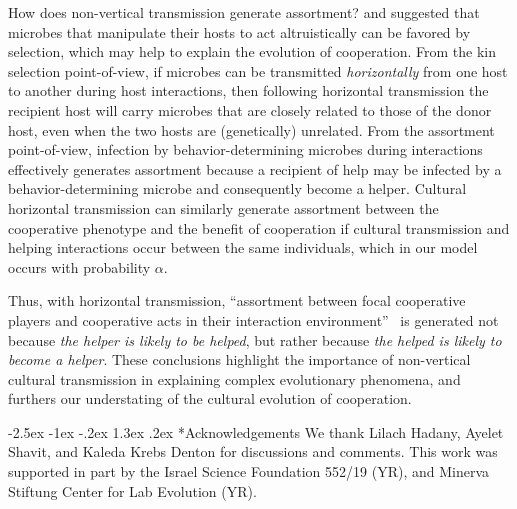 \documentclass[12pt]{extarticle}
\makeatletter
\renewcommand\section{\@startsection {section}{1}{\z@}%
     {-2.5ex \@plus -1ex \@minus -.2ex}%
     {1.3ex \@plus.2ex}%
    {\Large\bfseries}}
\makeatother
\begin{document}
{How does non-vertical transmission generate assortment? 
\citet{lewin2017microbes} and \citet{lewin2020rockpaperscissors} 
suggested that microbes that manipulate their hosts to act altruistically can be favored by selection, which may help to explain the evolution of cooperation. 
From the kin selection point-of-view, if microbes can be transmitted \emph{horizontally} from one host to another during host interactions, then following horizontal transmission the recipient host will carry microbes that are closely related to those of the donor host, 
even when the two hosts are (genetically) unrelated. 
From the assortment point-of-view,
infection by behavior-determining microbes during interactions effectively generates assortment because a recipient of help may be infected by a behavior-determining microbe and consequently become a helper.
Cultural horizontal transmission can similarly generate assortment between the cooperative phenotype and the benefit of cooperation if cultural transmission and helping interactions occur between the same individuals, which in our model occurs with probability $\alpha$. 

Thus, with horizontal transmission, ``assortment between focal cooperative players and cooperative acts in their interaction
environment''~\citep{Fletcher2009assortment} is generated not because \emph{the helper is likely to be helped}, but rather because \emph{the helped is likely to become a helper}.
These conclusions highlight the importance of non-vertical cultural transmission in explaining complex evolutionary phenomena, and  furthers our understating of the cultural evolution of cooperation. 



{\small
\section*{Acknowledgements}
We thank Lilach Hadany, Ayelet Shavit, and Kaleda Krebs Denton for discussions and comments.
This work was supported in part by
the Israel Science Foundation 552/19 (YR),
and Minerva Stiftung Center for Lab Evolution (YR).
}



}
\end{document}
